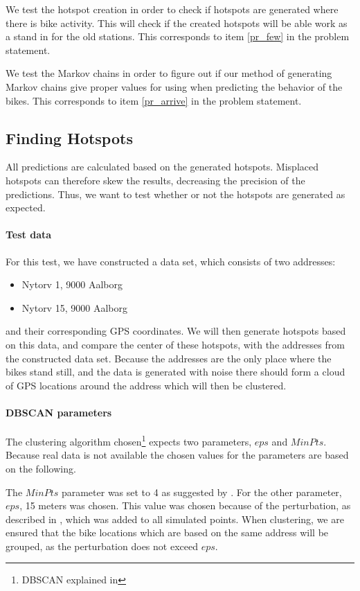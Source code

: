 We test the hotspot creation in order to check if hotspots are generated where there is bike activity. 
This will check if the created hotspots will be able work as a stand in for the old stations.
This corresponds to item \ref{pr_few} in the problem statement.

We test the Markov chains in order to figure out if our method of generating Markov chains give proper values for using when predicting the behavior of the bikes.
This corresponds to item \ref{pr_arrive} in the problem statement.

\subsection{Finding Hotspots}
All predictions are calculated based on the generated hotspots.
Misplaced hotspots can therefore skew the results, decreasing the precision of the predictions.
Thus, we want to test whether or not the hotspots are generated as expected.

\paragraph{Test data}
For this test, we have constructed a data set, which consists of two addresses:
\begin{itemize}
\item Nytorv 1, 9000 Aalborg
\item Nytorv 15, 9000 Aalborg
\end{itemize}
and their corresponding GPS coordinates.
We will then generate hotspots based on this data, and compare the center of these hotspots, with the addresses from the constructed data set.
Because the addresses are the only place where the bikes stand still, and the data is generated with noise there should form a cloud of GPS locations around the address which will then be clustered.


\paragraph{DBSCAN parameters}
The clustering algorithm chosen\footnote{DBSCAN explained in } expects two parameters, $eps$ and $MinPts$.
Because real data is not available the chosen values for the parameters are based on the following.

The $MinPts$ parameter was set to 4 as suggested by \citet[Page 529]{pang2006introduction}.
For the other parameter, $eps$, 15 meters was chosen.
This value was chosen because of the perturbation, as described in , which was added to all simulated points.
When clustering, we are ensured that the bike locations which are based on the same address will be grouped, as the perturbation does not exceed $eps$.

